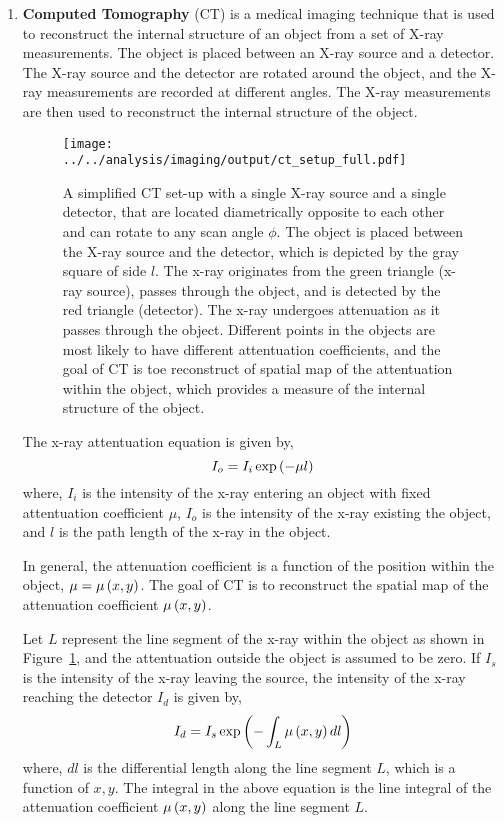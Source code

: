 \documentclass[12pt]{article}
\def\lp{\ensuremath\left(}
\def\rp{\ensuremath\right)}
\newcommand{\ct}[1]{\lp #1\rp}
\begin{document}
\begin{enumerate}
\item \textbf{Computed Tomography} (CT) is a medical imaging technique that is used to reconstruct the internal structure of an object from a set of X-ray measurements. The object is placed between an X-ray source and a detector. The X-ray source and the detector are rotated around the object, and the X-ray measurements are recorded at different angles. The X-ray measurements are then used to reconstruct the internal structure of the object.
\begin{figure}[h]
    \centering
    \texttt{[image: ../../analysis/imaging/output/ct\_setup\_full.pdf]}
    \caption{A simplified CT set-up with a single X-ray source and a single detector, that are located diametrically opposite to each other and can rotate to any scan angle $\phi$. The object is placed between the X-ray source and the detector, which is depicted by the gray square of side $l$. The x-ray originates from the green triangle (x-ray source), passes through the object, and is detected by the red triangle (detector). The x-ray undergoes attenuation as it passes through the object. Different points in the objects are most likely to have different attentuation coefficients, and the goal of CT is toe reconstruct of spatial map of the attentuation within the object, which provides a measure of the internal structure of the object.}
    \label{fig:ct}
\end{figure}

The x-ray attentuation equation is given by,
\[ I_o = I_i \exp\lp -\mu l \rp \]
where, $I_i$ is the intensity of the x-ray entering an object with fixed attentuation coefficient $\mu$, $I_o$ is the intensity of the x-ray existing the object, and $l$ is the path length of the x-ray in the object. 

In general, the attenuation coefficient is a function of the position within the object, $\mu = \mu\ct{x,y}$. The goal of CT is to reconstruct the spatial map of the attenuation coefficient $\mu\ct{x,y}$.

Let $L$ represent the line segment of the x-ray within the object as shown in Figure~\ref{fig:ct}, and the attentuation outside the object is assumed to be zero. If $I_s$ is the intensity of the x-ray leaving the source, the intensity of the x-ray reaching the detector $I_d$ is given by,
\[ I_d = I_s \exp\lp - \int_L \mu \ct{x, y} dl \rp \]
where, $dl$ is the differential length along the line segment $L$, which is a function of $x, y$. The integral in the above equation is the line integral of the attenuation coefficient $\mu\ct{x,y}$ along the line segment $L$.


\end{enumerate}
\end{document}
